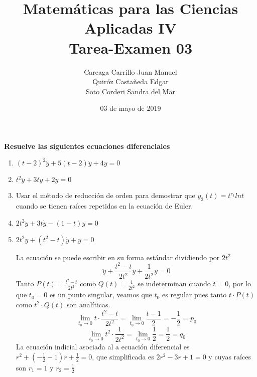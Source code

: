 \documentclass{article}
\title{
    Matemáticas para las Ciencias Aplicadas IV\\
    Tarea-Examen 03 
}
\author{
    Careaga Carrillo Juan Manuel \\
    Quiróz Castañeda Edgar \\
    Soto Corderi Sandra del Mar
}
\date{
    03 de mayo de 2019
}
\begin{document}
    \maketitle
    {\bf Resuelve las siguientes ecuaciones diferenciales}
    \begin{enumerate}
        
        \item {
            $(t - 2)^2 \ddot y + 5(t-2)\dot y+4y=0$\\

            \color{azul}
            
        }
        \item {
            $t^2 \ddot y+ 3t \dot y + 2y =0$\\

            \color{azul}
            
        }
        \item {
            Usar el método de reducción de orden para demostrar que 
            $y_2(t) = t ^ {r_1} ln t$ cuando se tienen raíces repetidas en la 
            ecuación de Euler. 

            \color{azul}
           
        }
        \item {
            $2t^2\ddot y + 3t\dot y - (1 - t)y = 0$

            \color{azul}

        }

        \item {
            $2t^2\ddot y + (t^2 - t)\dot y + y = 0$

            \color{azul}
            La ecuación se puede escribir en su forma estándar dividiendo por $2t^2$
            \[
                \ddot y + \frac{t^2-t}{2t^2}\dot y + \frac{1}{2t^2}y = 0
            \]
            Tanto $P(t)=\frac{t^2-t}{2t^2}$ como $Q(t)=\frac{1}{2t^2}$ se indeterminan cuando $t=0$, por lo que $t_0=0$ es un punto singular, veamos que $t_0$ es regular pues tanto $t\cdot P(t)$ como $t^2\cdot Q(t)$ son analíticas.
            \[
                \lim_{t_0 \to 0}{t\cdot\frac{t^2-t}{2t^2}}
                =\lim_{t_0\to 0}{\frac{t-1}{2}}
                =-\frac{1}{2}=p_0
            \]
            \[
                \lim_{t_0\to 0}{t^2\cdot\frac{1}{2t^2}}
                =\lim_{t_0\to 0}{\frac{1}{2}}
                =\frac{1}{2}=q_0
            \]
            La ecuación indicial asociada al a ecuación diferencial es $r^2+(-\frac{1}{2}-1)r+\frac{1}{2}=0$, que simplificada es $2r^2-3r+1=0$ y cuyas raíces son $r_1=1$ y $r_2=\frac{1}{2}$

}
\end{enumerate}
\end{document}
